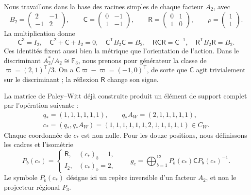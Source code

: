 Nous travaillons dans la base des racines simples de chaque facteur \(A_2\), avec
\begin{equation}
 B_2=\begin{pmatrix}2&-1\\-1&2\end{pmatrix},\qquad
 \mathsf C=\begin{pmatrix}0&-1\\1&-1\end{pmatrix},\qquad
 \mathsf R=\begin{pmatrix}0&1\\1&0\end{pmatrix},\qquad
 \rho=\begin{pmatrix}1\\1\end{pmatrix}.
 \label{x_reciprocidad:km:coxeter-reflexion}
\end{equation}
La multiplication donne
\[
 \mathsf C^3=I_2,\quad
 \mathsf C^2+\mathsf C+I_2=0,\quad
 \mathsf C^{\mathsf T}B_2\mathsf C=B_2,\quad
 \mathsf R\mathsf C\mathsf R=\mathsf C^{-1},\quad
 \mathsf R^{\mathsf T}B_2\mathsf R=B_2.
\]
Ces identités fixent aussi bien la métrique que l'orientation de l'action. Dans le discriminant \(A_2^*/A_2\cong\mathbb F_3\), nous prenons pour générateur la classe de \(\varpi=(2,1)^{\mathsf T}/3\). On a \(\mathsf C\varpi-\varpi=(-1,0)^{\mathsf T}\), de sorte que \(\mathsf C\) agit trivialement sur le discriminant ; la réflexion \(\mathsf R\) change son signe.

La matrice de Paley--Witt déjà construite produit un élément de support
complet par l'opération suivante :
\begin{equation}
 \begin{gathered}
 q_*=(1,1,1,1,1,1),\qquad q_*A_W=(2,1,1,1,1,1),\\
 c_*=(q_*,q_*A_W)
 =(1,1,1,1,1,1,2,1,1,1,1,1)\in C_W.
 \end{gathered}
 \label{x_reciprocidad:km:palabra-total}
\end{equation}
Chaque coordonnée de \(c_*\) est non nulle. Pour les douze positions,
nous définissons les cadres et l'isométrie
\begin{equation}
 P_b(c_*)=
 \begin{cases}\mathsf R,&(c_*)_b=1,\\I_2,&(c_*)_b=2,\end{cases}
 \qquad
 g_c=\bigoplus_{b=1}^{12}P_b(c_*)\mathsf C P_b(c_*)^{-1}.
 \label{x_reciprocidad:km:isometria-ternaria}
\end{equation}
Le symbole \(P_b(c_*)\) désigne ici un repère inversible d’un facteur
\(A_2\), et non le projecteur régional \(P_3\).

